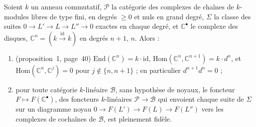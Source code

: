 \begin{encadre}
\begin{theoreme*}
Soient $k$ un anneau commutatif, $\mathcal P$ la catégorie des complexes de chaînes de $k$-modules libres de type fini, en degrés $\geqslant 0$ et nuls en grand degré, $\Sigma$ la classe des suites $0 \to L' \to L \to L'' \to 0$ exactes en chaque degré, et $\mathbb C^\bullet$ le complexe des disques, $\mathbb C^n = (k \xrightarrow{\mathrm{id}} k)$ en degrés $n+1$, $n$. Alors :
\begin{enumerate}
\item (proposition~1, page~40) $\mathrm{End}(\mathbb C^n) = k \cdot \mathrm{id}$, $\mathrm{Hom}(\mathbb C^n, \mathbb C^{n+1}) = k \cdot d^n$, et $\mathrm{Hom}(\mathbb C^n, \mathbb C^j) = 0$ pour $j \notin \{n, n+1\}$ ; en particulier $d^{n+1} d^n = 0$ ;
\item pour toute catégorie $k$-linéaire $\mathcal B$, sans hypothèse de noyaux, le foncteur $F \mapsto F(\mathbb C^\bullet)$, des foncteurs $k$-linéaires $\mathcal P \to \mathcal B$ qui envoient chaque suite de $\Sigma$ sur un diagramme noyau $0 \to F(L') \to F(L) \to F(L'')$ vers les complexes de cochaînes de $\mathcal B$, est pleinement fidèle.
\end{enumerate}
\end{theoreme*}
\end{encadre}
